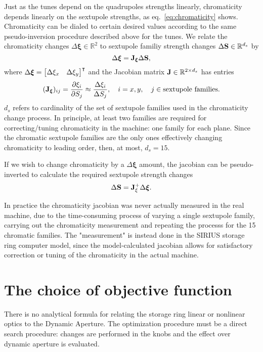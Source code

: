 Just as the tunes depend on the quadrupoles strengths linearly, chromaticity depends linearly on the sextupole strengths, as eq.~\eqref{eq:chromaticity} shows. Chromaticity can be dialed to certain desired values according to the same pseudo-inversion procedure described above for the tunes. We relate the chromaticity changes $\Delta \boldsymbol{\xi}\in\mathbb{R}^2$ to sextupole familiy strength changes $\Delta \vb{S}\in\mathbb{R}^{d_s}$ by
\begin{equation}
    \Delta\boldsymbol{\xi} = \vb{J}_{\boldsymbol{\xi}}\Delta \vb{S},
\end{equation}
where $\Delta\boldsymbol{\xi} = \mqty*[\Delta \xi_x & \Delta \xi_y]^\intercal$ and the Jacobian matrix $\vb{J}\in\mathbb{R}^{2 \times d_s}$ has entries
\begin{equation}
    (\vb{J}_{\boldsymbol{\xi}})_{ij} = \pdv{\xi_{i}}{S_j} \approx \frac{\Delta \xi_{i}}{\Delta S_j},\quad i=x, y, \quad j\in\text{sextupole families}.
\end{equation}
$d_s$ refers to cardinality of the set of sextupole families used in the chromaticity change process. In principle, at least two families are required for correcting/tuning chromaticity in the machine: one family for each plane. Since the chromatic sextupole families are the only ones effectively changing chromaticity to leading order, then, at most, $d_s=15$.

If we wish to change chromaticity by a $\Delta\boldsymbol{\xi}$ amount, the jacobian can be pseudo-inverted to calculate the required sextupole strength changes
\begin{equation}
    \Delta \vb{S} = \vb{J}_{\xi}^{+}\Delta \boldsymbol{\xi}.
\end{equation}

In practice the chromaticity jacobian was never actually measured in the real machine, due to the time-consuming process of varying a single sextupole family, carrying out the chromaticity measurement and repeating the processs for the 15 chromatic families. The "measurement" is instead done in the SIRIUS storage ring computer model, since the model-calculated jacobian allows for satisfactory correction or tuning of the chromaticity in the actual machine.
\section{The choice of objective function}
There is no analytical formula for relating the storage ring linear or nonlinear optics to the Dynamic Aperture. The optimization procedure must be a direct search procedure: changes are performed in the knobs and the effect over dynamic aperture is evaluated.

